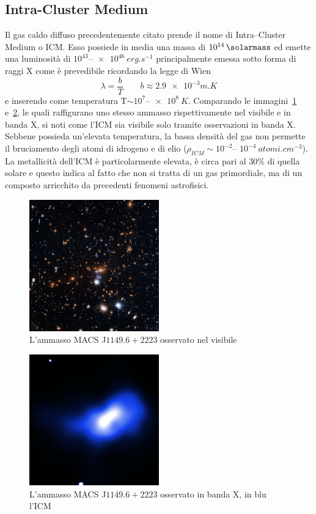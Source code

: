 \subsection{Intra-Cluster Medium}\label{sec:intra-cluster-medium}
Il gas caldo diffuso precedentemente citato prende il nome di Intra--Cluster Medium o ICM. Esso possiede in media una massa di $10^{14}\, \si{\solarmass}$ ed emette una luminosità di $10^{43}$--$\SI{e46}{erg.s^{-1}}$ principalmente emessa sotto forma di raggi X come è prevedibile ricordando la legge di Wien
\begin{equation}
    \lambda = \frac{b}{T}                                         \qquad b \approx \num{2.9e-3} \si{m.K} 
\end{equation}
e inserendo come temperatura T$\sim 10^7$--$\SI{e8}{K}$.
Comparando le immagini~\ref{fig:visible-icm} e~\ref{fig:icm}, le quali raffigurano uno stesso ammasso rispettivamente nel visibile e in banda X, si noti come l'ICM sia visibile solo tramite osservazioni in banda X.
Sebbene possieda un’elevata temperatura, la bassa densità del gas non permette il bruciamento degli atomi di idrogeno e di elio ($\rho_{ICM}\sim 10^{-2}$-- $10^{-4}\:\si{atomi.cm^{-3}}$).
La metallicità dell’ICM è particolarmente elevata, è circa pari al $30\%$ di quella solare e questo indica al fatto che non si tratta di un gas primordiale, ma di un composto arricchito da precedenti fenomeni astrofisici.
\begin{figure}
    \centering
    \includegraphics[width = 0.5\textwidth]{immagini/visible-icm.png}
    \caption{L'ammasso MACS J$1149.6+2223$ osservato nel visibile}
    \label{fig:visible-icm}
\end{figure}
\begin{figure}
    \centering
    \includegraphics[width = 0.5\textwidth]{immagini/icm.png}
    \caption{L'ammasso MACS J$1149.6+2223$ osservato in banda X, in blu l'ICM}
    \label{fig:icm}
\end{figure}
